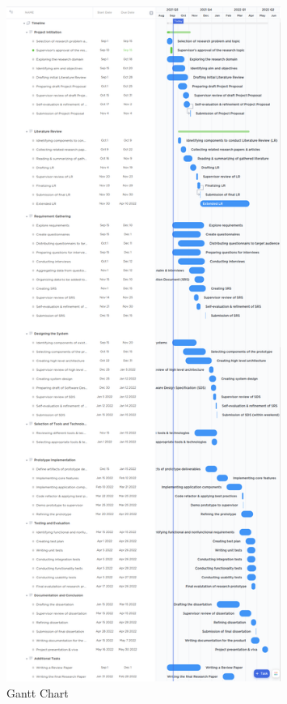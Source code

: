\begin{figure}[h!]
\centering
\includegraphics[width=0.8\textwidth,height=0.85\textheight]{images/gantt-chart.png}
\caption{Gantt Chart}
\end{figure}


